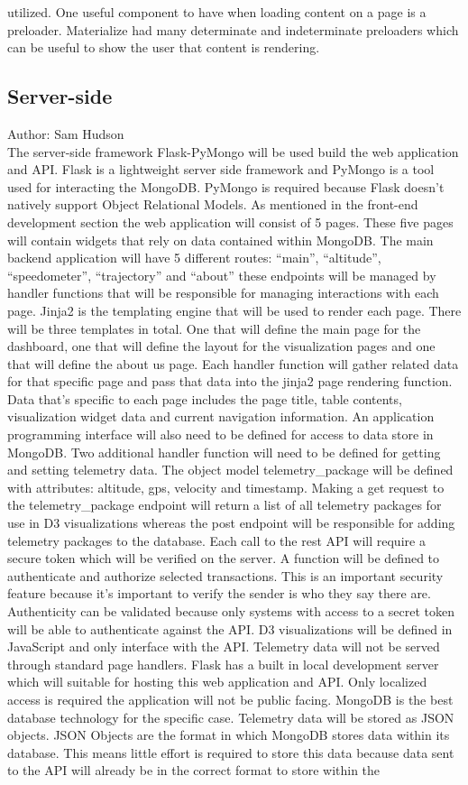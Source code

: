 \documentclass[onecolumn, draftclsnofoot,10pt, compsoc]{IEEEtran}
\begin{document}
utilized. One useful component to have when loading content on a page is a preloader. Materialize had many determinate and indeterminate preloaders which can be useful to show the user that content is rendering. 
\subsection {Server-side}
Author: Sam Hudson \\
The server-side framework Flask-PyMongo will be used build the web application and API. Flask is a lightweight server side framework and PyMongo is a tool used for interacting the MongoDB. PyMongo is required because Flask doesn’t natively support Object Relational Models. As mentioned in the front-end development section the web application will consist of 5 pages. These five pages will contain widgets that rely on data contained within MongoDB. The main backend application will have 5 different routes: “main”, “altitude”, “speedometer”, “trajectory” and “about” these endpoints will be managed by handler functions that will be responsible for managing interactions with each page. Jinja2 is the templating engine that will be used to render each page. There will be three templates in total. One that will define the main page for the dashboard, one that will define the layout for the visualization pages and one that will define the about us page. Each handler function will gather related data for that specific page and pass that data into the jinja2 page rendering function. Data that’s specific to each page includes the page title, table contents, visualization widget data and current navigation information. An application programming interface will also need to be defined for access to data store in MongoDB. Two additional handler function will need to be defined for getting and setting telemetry data. The object model telemetry\_package will be defined with attributes: altitude, gps, velocity and timestamp. Making a get request to the telemetry\_package endpoint will return a list of all telemetry packages for use in D3 visualizations whereas the post endpoint will be responsible for adding telemetry packages to the database. Each call to the rest API will require a secure token which will be verified on the server. A function will be defined to authenticate and authorize selected transactions. This is an important security feature because it’s important to verify the sender is who they say there are. Authenticity can be validated because only systems with access to a secret token will be able to authenticate against the API. D3 visualizations will be defined in JavaScript and only interface with the API. Telemetry data will not be served through standard page handlers. Flask has a built in local development server which will suitable for hosting this web application and API. Only localized access is required the application will not be public facing. MongoDB is the best database technology for the specific case. Telemetry data will be stored as JSON objects. JSON Objects are the format in which MongoDB stores data within its database. This means little effort is required to store this data because data sent to the API will already be in the correct format to store within the 
\end{document}
